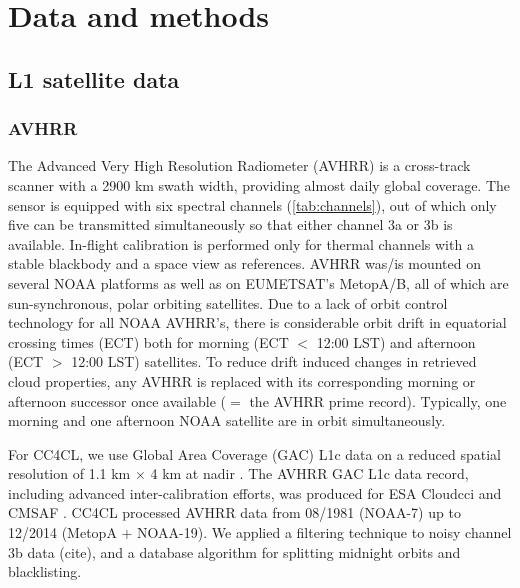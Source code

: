 \section{Data and methods}\label{input_data}

\subsection{L1 satellite data}\label{sec:L1_data}

\subsubsection{AVHRR}

The Advanced Very High Resolution Radiometer (AVHRR) is a cross-track scanner with a 2900 km swath width, providing almost daily global coverage. The sensor is equipped with six spectral channels (\autoref{tab:channels}), out of which only five can be transmitted simultaneously so that either channel 3a or 3b is available. In-flight calibration is performed only for thermal channels with a stable blackbody and a space view as references. AVHRR was/is mounted on several NOAA platforms as well as on EUMETSAT's MetopA/B, all of which are sun-synchronous, polar orbiting satellites. Due to a lack of orbit control technology for all NOAA AVHRR's, there is considerable orbit drift in equatorial crossing times (ECT) both for morning (ECT $<$ 12:00 LST) and afternoon (ECT $>$ 12:00 LST) satellites. To reduce drift induced changes in retrieved cloud properties, any AVHRR is replaced with its corresponding morning or afternoon successor once available ($=$ the AVHRR prime record). Typically, one morning and one afternoon NOAA satellite are in orbit simultaneously. 

For CC4CL, we use Global Area Coverage (GAC) L1c data on a reduced spatial resolution of 1.1 km $\times$ 4 km at nadir \citep{Devasthale16}. The AVHRR GAC L1c data record, including advanced inter-calibration efforts, was produced for ESA Cloud\textunderscore cci and CMSAF \citep{Schulz09,Karlsson13}. CC4CL processed AVHRR data from 08/1981 (NOAA-7) up to 12/2014 (MetopA + NOAA-19). We applied a filtering technique to noisy channel 3b data (cite), and a database algorithm for splitting midnight orbits and blacklisting. 

